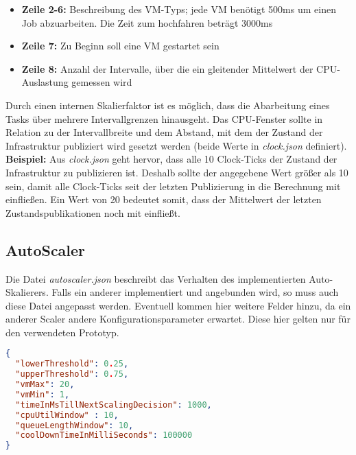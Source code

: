 \begin{itemize}
	\item \textbf{Zeile 2-6:} Beschreibung des VM-Typs; jede VM benötigt 500ms um einen Job abzuarbeiten. Die Zeit zum hochfahren beträgt 3000ms
	\item \textbf{Zeile 7:} Zu Beginn soll eine VM gestartet sein
	\item \textbf{Zeile 8:} Anzahl der Intervalle, über die ein gleitender Mittelwert der CPU-Auslastung gemessen wird  
	
\end{itemize}
Durch einen internen Skalierfaktor ist es möglich, dass die Abarbeitung eines Tasks über mehrere Intervallgrenzen hinausgeht. Das CPU-Fenster sollte in Relation zu der Intervallbreite und dem Abstand, mit dem der Zustand der Infrastruktur publiziert wird gesetzt werden (beide Werte in \textit{clock.json} definiert). \\
\textbf{Beispiel:} Aus \textit{clock.json} geht hervor, dass alle 10 Clock-Ticks der Zustand der Infrastruktur zu publizieren ist. Deshalb sollte der angegebene Wert größer als 10 sein, damit alle Clock-Ticks seit der letzten Publizierung in die Berechnung mit einfließen. Ein Wert von 20 bedeutet somit, dass der Mittelwert der letzten Zustandspublikationen noch mit einfließt.


\subsection{AutoScaler}
Die Datei \textit{autoscaler.json} beschreibt das Verhalten des implementierten Auto-Skalierers. Falls ein anderer implementiert und angebunden wird, so muss auch diese Datei angepasst werden. Eventuell kommen hier weitere Felder hinzu, da ein anderer Scaler andere Konfigurationsparameter erwartet. Diese hier gelten nur für den verwendeten Prototyp.

\begin{lstlisting}[language=json,firstnumber=1]
{
  "lowerThreshold": 0.25,
  "upperThreshold": 0.75,
  "vmMax": 20,
  "vmMin": 1,
  "timeInMsTillNextScalingDecision": 1000,
  "cpuUtilWindow" : 10,
  "queueLengthWindow": 10,
  "coolDownTimeInMilliSeconds": 100000
}
\end{lstlisting}

